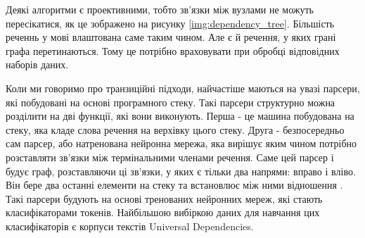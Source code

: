 Деякі алгоритми є проективними, тобто зв'язки між вузлами не можуть пересікатися, як
це зображено на рисунку \ref{img:dependency_tree}. Більшість реченнь у мові
влаштована саме таким чином. Але є й речення, у яких грані графа перетинаються. Тому це
потрібно враховувати при обробці відповідних наборів даних.

Коли ми говоримо про транзиційні підходи, найчастіше маються на увазі
парсери, які побудовані на основі програмного стеку. Такі парсери структурно можна
розділити на дві функції, які вони виконують. Перша - це машина побудована на стеку,
яка кладе слова речення на верхівку цього стеку. Друга - безпосередньо
сам парсер, або натренована нейронна мережа, яка вирішує яким чином потрібно
розставляти зв'язки між термінальними членами речення. Саме цей парсер і будує
граф, розставляючи ці зв'язки, у яких є тільки два напрями: вправо і вліво.
Він бере два останні елементи на стеку та встановлює між ними відношення \cite{bib8}.
Такі парсери будують на основі тренованих нейронних мереж, які
стають класифікаторами токенів. Найбільшою вибіркою даних для навчання цих класифікаторів
є корпуси текстів Universal Dependencies.